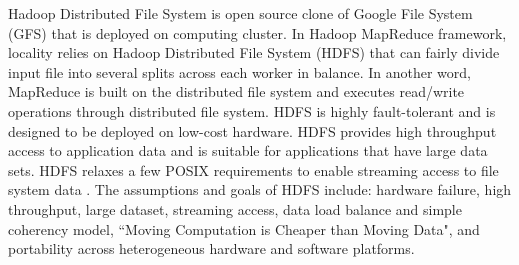 
Hadoop Distributed File System \cite{HDFS} is open source clone of Google File System (GFS) \cite{ghemawat2003google} that is deployed on computing cluster. In Hadoop MapReduce framework, locality relies on Hadoop Distributed File System (HDFS) that can fairly divide input file into several splits across each worker in balance. In another word, MapReduce is built on the distributed file system and executes read/write operations through distributed file system. HDFS is highly fault-tolerant and is designed to be deployed on low-cost hardware. HDFS provides high throughput access to application data and is suitable for applications that have large data sets. HDFS relaxes a few POSIX requirements to enable streaming access to file system data \cite{HDFS}. The assumptions and goals of HDFS include: hardware failure, high throughput, large dataset, streaming access, data load balance and simple coherency model, ``Moving Computation is Cheaper than Moving Data", and portability across heterogeneous hardware and software platforms. 


